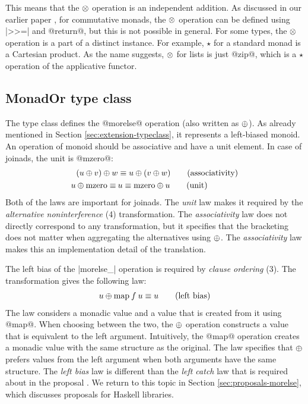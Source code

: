 \documentclass[preprint]{sigplanconf}
\begin{document}
This means that the $\otimes$ operation is an independent addition. As discussed in our earlier
paper \cite{joinads}, for commutative monads, the $\otimes$ operation can be defined using |>>=|
and @return@, but this is not possible in general. For some types, the $\otimes$ operation is a 
part of a distinct  instance. For example, $\star$ for a standard 
monad is a Cartesian product. As the name suggests, $\otimes$ for lists is just @zip@, which is 
a $\star$ operation of the  applicative functor.


\subsection{MonadOr type class}
\label{sec:laws-monador}

The  type class defines the @morelse@ operation (also written as $\oplus$). As
already mentioned in Section \ref{sec:extension-typeclass}, it represents a left-biased monoid.
An operation of monoid should be associative and have a unit element. In case of joinads, the
unit is @mzero@:
\begin{align*}
  (u \oplus v) \oplus w &\equiv u \oplus (v \oplus w) \tag{associativity} \\
  u \oplus \text{mzero} \equiv \: &u \equiv \text{mzero} \oplus u \tag{unit}
\end{align*}
Both of the laws are important for joinads. The \textit{unit} law makes it required by the
\textit{alternative noninterference} (4) transformation. The \textit{associativity} law does not 
directly correspond to any transformation, but it specifies that the bracketing does not matter when
aggregating the alternatives using $\oplus$. The \textit{associativity} law makes this an 
implementation detail of the translation.

The left bias of the |morelse_| operation is required by \textit{clause ordering} (3).
The transformation gives the following law:
\begin{align*}
  u \oplus \text{map} \: f \: u \equiv u \tag{left bias}
\end{align*}
The law considers a monadic value and a value that is created from it using @map@. When choosing 
between the two, the $\oplus$ operation constructs a value that is equivalent to the left 
argument. Intuitively, the @map@ operation creates a monadic value with the same structure as the 
original. The law specifies that $\oplus$ prefers values from the left argument when both 
arguments have the same structure.
The \textit{left bias} law is different than the \textit{left catch} law that is 
required about  in the proposal \cite{monadplusreform}. We return to this topic in 
Section \ref{sec:proposals-morelse}, which discusses proposals for Haskell libraries.
\end{document}
